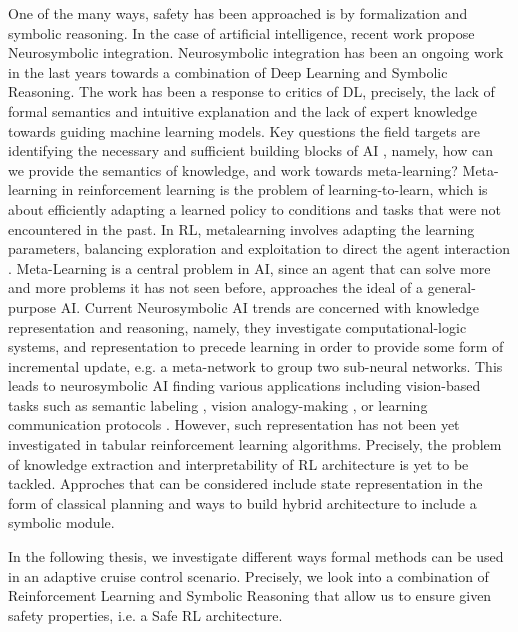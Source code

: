 \documentclass[a4paper,11pt]{article}
\begin{document}
\medskip

One of the many ways, safety has been approached is by formalization and symbolic reasoning. 
In the case of artificial intelligence, recent work propose Neurosymbolic integration. 
Neurosymbolic integration has been an ongoing work in the last years towards a combination of Deep Learning and Symbolic Reasoning.
The work has been a response to critics of DL, precisely, the lack of formal semantics and intuitive explanation and the lack of expert knowledge towards guiding machine learning models. 
Key questions the field targets are identifying the necessary and sufficient building blocks of AI \cite{garcez2020neurosymbolic}, namely, how can we provide the semantics of knowledge, 
and work towards meta-learning? Meta-learning in reinforcement learning is the problem of learning-to-learn, which is about efficiently
adapting a learned policy to conditions and tasks that were not encountered in the past. In RL, metalearning
involves adapting the learning parameters, balancing exploration and exploitation to direct the
agent interaction \cite{gupta_meta-reinforcement_2018,schweighofer_meta-learning_2003}. Meta-Learning is a central problem in AI, since an agent that can solve more
and more problems it has not seen before, approaches the ideal of a general-purpose AI. \newline
Current Neurosymbolic AI trends are concerned with knowledge representation and reasoning, namely, they investigate computational-logic systems, 
and representation to precede learning in order to provide some form of incremental update, e.g. a meta-network to group two sub-neural networks. \cite{Besold2017NeuralSymbolicLA}
This leads to neurosymbolic AI finding various applications including vision-based tasks such as semantic labeling \cite{vinyals2015, karpathy2015}, 
vision analogy-making \cite{Reed2015DeepVA}, or learning communication protocols \cite{Foerster2016LearningTC}.
However, such representation has not been yet investigated in tabular reinforcement learning algorithms. Precisely, the problem of knowledge extraction and interpretability of RL architecture is yet to be tackled. 
Approches that can be considered include state representation in the form of classical planning and ways to build hybrid architecture to include a symbolic module. 

\medskip



In the following thesis, we investigate different ways formal methods can be used in an adaptive cruise control scenario. Precisely, we look into a combination of Reinforcement Learning
and Symbolic Reasoning that allow us to ensure given safety properties, i.e. a Safe RL architecture. 
\end{document}
